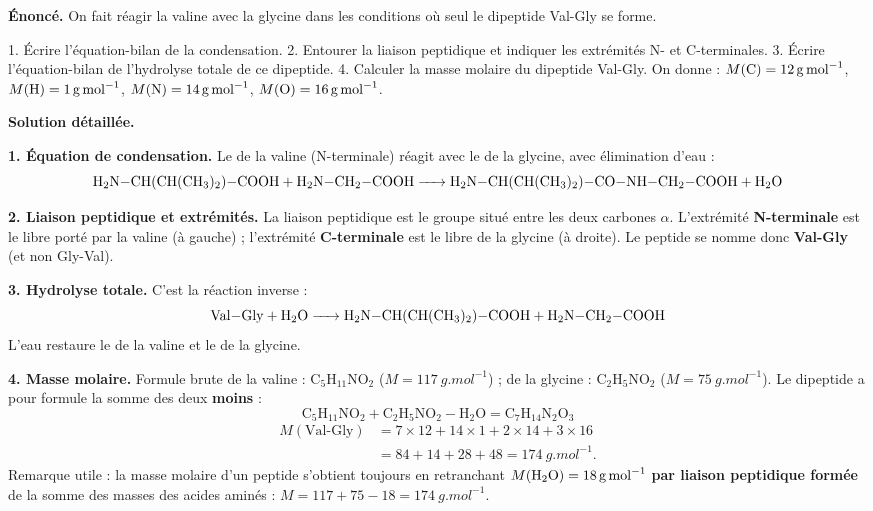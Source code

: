 \documentclass[11pt]{article}
\begin{document}
\begin{exoresolu}
\textbf{Énoncé.} On fait réagir la valine  avec la glycine  dans les conditions où seul le dipeptide Val-Gly se forme.

1. Écrire l'équation-bilan de la condensation.
2. Entourer la liaison peptidique et indiquer les extrémités N- et C-terminales.
3. Écrire l'équation-bilan de l'hydrolyse totale de ce dipeptide.
4. Calculer la masse molaire du dipeptide Val-Gly. On donne : $M(\ce{C}) = \SI{12}{g.mol^{-1}}$, $M(\ce{H}) = \SI{1}{g.mol^{-1}}$, $M(\ce{N}) = \SI{14}{g.mol^{-1}}$, $M(\ce{O}) = \SI{16}{g.mol^{-1}}$.

\tcblower
\textbf{Solution détaillée.}

\textbf{1. Équation de condensation.} Le  de la valine (N-terminale) réagit avec le  de la glycine, avec élimination d'eau :
\[ \ce{H2N-CH(CH(CH3)2)-COOH + H2N-CH2-COOH -> H2N-CH(CH(CH3)2)-CO-NH-CH2-COOH + H2O} \]

\textbf{2. Liaison peptidique et extrémités.} La liaison peptidique est le groupe  situé entre les deux carbones $\alpha$. L'extrémité \textbf{N-terminale} est le  libre porté par la valine (à gauche) ; l'extrémité \textbf{C-terminale} est le  libre de la glycine (à droite). Le peptide se nomme donc \textbf{Val-Gly} (et non Gly-Val).

\textbf{3. Hydrolyse totale.} C'est la réaction inverse :
\[ \ce{Val-Gly + H2O -> H2N-CH(CH(CH3)2)-COOH + H2N-CH2-COOH} \]
L'eau restaure le  de la valine et le  de la glycine.

\textbf{4. Masse molaire.} Formule brute de la valine : $\mathrm{C_5H_{11}NO_2}$ ($M = \SI{117}{g.mol^{-1}}$) ; de la glycine : $\mathrm{C_2H_5NO_2}$ ($M = \SI{75}{g.mol^{-1}}$). Le dipeptide a pour formule la somme des deux \textbf{moins}  :
\[ \mathrm{C_5H_{11}NO_2 + C_2H_5NO_2 - H_2O = C_7H_{14}N_2O_3} \]
\begin{align*}
M(\text{Val-Gly}) &= 7 \times 12 + 14 \times 1 + 2 \times 14 + 3 \times 16 \\
&= 84 + 14 + 28 + 48 = \SI{174}{g.mol^{-1}}.
\end{align*}
Remarque utile : la masse molaire d'un peptide s'obtient toujours en retranchant $M(\ce{H2O}) = \SI{18}{g.mol^{-1}}$ \textbf{par liaison peptidique formée} de la somme des masses des acides aminés : $M = 117 + 75 - 18 = \SI{174}{g.mol^{-1}}$.
\end{exoresolu}
\end{document}
